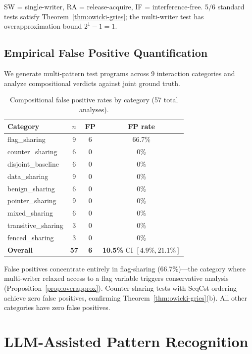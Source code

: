 \documentclass[11pt]{article}
\begin{document}
\noindent
SW = single-writer, RA = release-acquire, IF = interference-free.
5/6 standard tests satisfy Theorem~\ref{thm:owicki-gries};
the multi-writer test has overapproximation bound $2^1 - 1 = 1$.

\subsection{Empirical False Positive Quantification}

We generate multi-pattern test programs across 9 interaction
categories and analyze compositional verdicts against
joint ground truth.

\begin{table}[ht]
\centering
\caption{Compositional false positive rates by category (57 total analyses).}
\label{tab:fp-rates}
\small
\begin{tabular}{lccc}
\toprule
\textbf{Category} & \textbf{$n$} & \textbf{FP} & \textbf{FP rate} \\
\midrule
flag\_sharing & 9 & 6 & 66.7\% \\
counter\_sharing & 6 & 0 & 0\% \\
disjoint\_baseline & 6 & 0 & 0\% \\
data\_sharing & 9 & 0 & 0\% \\
benign\_sharing & 6 & 0 & 0\% \\
pointer\_sharing & 9 & 0 & 0\% \\
mixed\_sharing & 6 & 0 & 0\% \\
transitive\_sharing & 3 & 0 & 0\% \\
fenced\_sharing & 3 & 0 & 0\% \\
\midrule
\textbf{Overall} & \textbf{57} & \textbf{6} & \textbf{10.5\%}
 CI $[4.9\%, 21.1\%]$ \\
\bottomrule
\end{tabular}
\end{table}

\noindent
False positives concentrate entirely in flag-sharing (66.7\%)---the
category where multi-writer relaxed access to a flag variable
triggers conservative analysis (Proposition~\ref{prop:overapprox}).
Counter-sharing tests with SeqCst ordering achieve zero false
positives, confirming Theorem~\ref{thm:owicki-gries}(b).
All other categories have zero false positives.

\section{LLM-Assisted Pattern Recognition}
\label{sec:llm}
\end{document}
